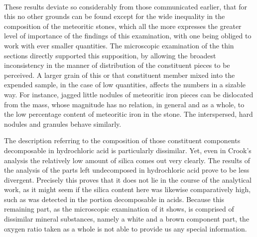 \documentclass[a4paper, 12pt, oneside]{article}
\begin{document}
\paragraph{}
These results deviate so considerably from those communicated earlier, that for this no other grounds can be found except for the wide inequality in the composition of the meteoritic stones, which all the more expresses the greater level of importance of the findings of this examination, with one being obliged to work with ever smaller quantities. The microscopic examination of the thin sections directly supported this supposition, by allowing the broadest inconsistency in the manner of distribution of the constituent pieces to be perceived. A larger grain of this or that constituent member mixed into the expended sample, in the case of low quantities, affects the numbers in a sizable way. For instance, jagged little nodules of meteoritic iron pieces can be dislocated from the mass, whose magnitude has no relation, in general and as a whole, to the low percentage content of meteoritic iron in the stone. The interspersed, hard nodules and granules behave similarly.

The description referring to the composition of those constituent components decomposable in hydrochloric acid is particularly dissimilar. Yet, even in Crook's analysis the relatively low amount of silica comes out very clearly. The results of the analysis of the parts left undecomposed in hydrochloric acid prove to be less divergent. Precisely this proves that it does not lie in the course of the analytical work, as it might seem if the silica content here was likewise comparatively high, such as was detected in the portion decomposable in acids. Because this remaining part, as the microscopic examination of it shows, is comprised of dissimilar mineral substances, namely a white and a brown component part, the oxygen ratio taken as a whole is not able to provide us any special information.
\end{document}
